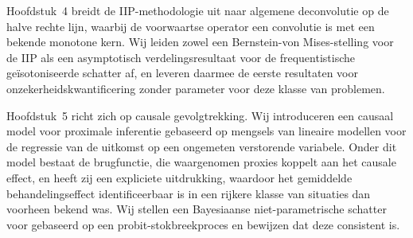 Hoofdstuk~4 breidt de IIP-methodologie uit naar algemene deconvolutie op de halve rechte lijn, waarbij de voorwaartse operator een convolutie is met een bekende monotone kern. Wij leiden zowel een Bernstein-von Mises-stelling voor de IIP als een asymptotisch verdelingsresultaat voor de frequentistische geïsotoniseerde schatter af, en leveren daarmee de eerste resultaten voor onzekerheidskwantificering zonder parameter voor deze klasse van problemen.

Hoofdstuk~5 richt zich op causale gevolgtrekking. Wij introduceren een causaal model voor proximale inferentie gebaseerd op mengsels van lineaire modellen voor de regressie van de uitkomst op een ongemeten verstorende variabele. Onder dit model bestaat de brugfunctie, die waargenomen proxies koppelt aan het causale effect, en heeft zij een expliciete uitdrukking, waardoor het gemiddelde behandelingseffect identificeerbaar is in een rijkere klasse van situaties dan voorheen bekend was. Wij stellen een Bayesiaanse niet-parametrische schatter voor gebaseerd op een probit-stokbreekproces en bewijzen dat deze consistent is.